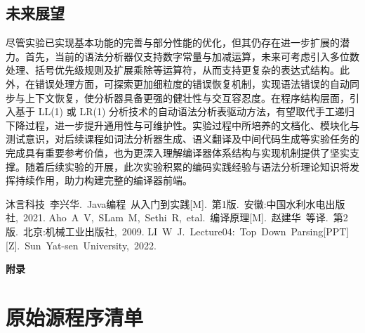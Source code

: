 \documentclass[a4paper, twoside, utf8]{ctexart}
\begin{document}
    \subsection{未来展望}

    尽管实验已实现基本功能的完善与部分性能的优化，但其仍存在进一步扩展的潜力。首先，当前的语法分析器仅支持数字常量与加减运算，未来可考虑引入多位数处理、括号优先级规则及扩展乘除等运算符，从而支持更复杂的表达式结构。此外，在错误处理方面，可探索更加细粒度的错误恢复机制，实现语法错误的自动同步与上下文恢复，使分析器具备更强的健壮性与交互容忍度。在程序结构层面，引入基于 LL(1) 或 LR(1) 分析技术的自动语法分析表驱动方法，有望取代手工递归下降过程，进一步提升通用性与可维护性。实验过程中所培养的文档化、模块化与测试意识，对后续课程如词法分析器生成、语义翻译及中间代码生成等实验任务的完成具有重要参考价值，也为更深入理解编译器体系结构与实现机制提供了坚实支撑。随着后续实验的开展，此次实验积累的编码实践经验与语法分析理论知识将发挥持续作用，助力构建完整的编译器前端。
	
    \begin{thebibliography}{99}
         沐言科技\ 李兴华.\ Java编程\ 从入门到实践[M].\ 第1版.\ 安徽:中国水利水电出版社,\ 2021.
         Aho\ A\ V,\ SLam\ M,\ Sethi\ R,\ etal.\ 编译原理[M].\ 赵建华\ 等译.\ 第2版.\ 北京:机械工业出版社,\ 2009.
         LI\ W\ J.\ Lecture04:\ Top\ Down\ Parsing[PPT][Z].\ Sun\ Yat-sen\ University,\ 2022.
    \end{thebibliography}
	
	\newpage
	\appendix
	\centerline{\Large{\textbf{附录}}}

    \section{原始源程序清单}
\end{document}
